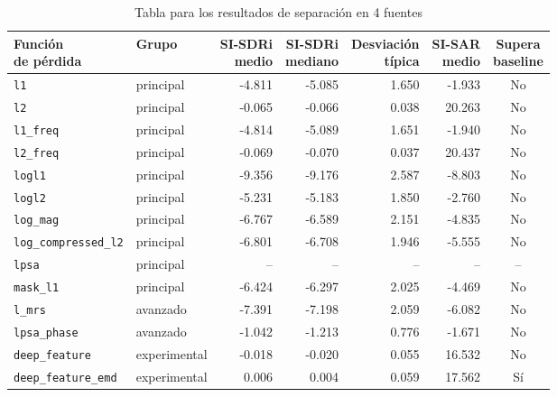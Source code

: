 \begin{table}[H]
    \centering
    \caption{Tabla para los resultados de separación en 4 fuentes}
    \label{tab:resultados-4-fuentes-sisdri}

    \begin{adjustbox}{center,max width=\textwidth}
        \begin{tabular}{llrrrrc}
            \toprule
            \makecell{\textbf{Función}\\\textbf{de pérdida}} &
            \textbf{Grupo} &
            \makecell{\textbf{SI-SDRi}\\\textbf{medio}} &
            \makecell{\textbf{SI-SDRi}\\\textbf{mediano}} &
            \makecell{\textbf{Desviación}\\\textbf{típica}} &
            \makecell{\textbf{SI-SAR}\\\textbf{medio}} &
            \makecell{\textbf{Supera}\\\textbf{baseline}} \\
            \midrule

            \texttt{l1}                  & principal    & -4.811 & -5.085 & 1.650 & -1.933 & No \\
            \texttt{l2}                  & principal    & -0.065 & -0.066 & 0.038 & 20.263 & No \\
            \texttt{l1\_freq}            & principal    & -4.814 & -5.089 & 1.651 & -1.940 & No \\
            \texttt{l2\_freq}            & principal    & -0.069 & -0.070 & 0.037 & 20.437 & No \\
            \texttt{logl1}               & principal    & -9.356 & -9.176 & 2.587 & -8.803 & No \\
            \texttt{logl2}               & principal    & -5.231 & -5.183 & 1.850 & -2.760 & No \\
            \texttt{log\_mag}            & principal    & -6.767 & -6.589 & 2.151 & -4.835 & No \\
            \texttt{log\_compressed\_l2} & principal    & -6.801 & -6.708 & 1.946 & -5.555 & No \\
            \texttt{lpsa}                & principal    & --     & --     & --    & --     & -- \\
            \texttt{mask\_l1}            & principal    & -6.424 & -6.297 & 2.025 & -4.469 & No \\
            \texttt{l\_mrs}              & avanzado     & -7.391 & -7.198 & 2.059 & -6.082 & No \\
            \texttt{lpsa\_phase}         & avanzado     & -1.042 & -1.213 & 0.776 & -1.671 & No \\
            \texttt{deep\_feature}       & experimental & -0.018 & -0.020 & 0.055 & 16.532 & No \\
            \texttt{deep\_feature\_emd}  & experimental & 0.006  & 0.004  & 0.059 & 17.562 & Sí \\

            \bottomrule
        \end{tabular}
    \end{adjustbox}
\end{table}

